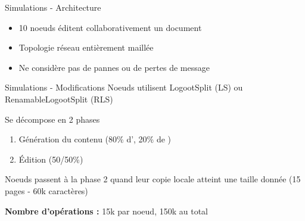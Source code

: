 \begin{frame}{Simulations - Architecture}
\begin{figure}
{
    }
  \end{figure}
  \begin{itemize}
    \item \alert{10 noeuds} éditent collaborativement un document
    \item Topologie \alert{réseau entièrement maillée}
    \item Ne considère \alert{pas de pannes ou de pertes de message}
  \end{itemize}
\end{frame}

\begin{frame}{Simulations - Modifications}
  Noeuds \alert{utilisent LogootSplit} (LS) ou \alert{RenamableLogootSplit} (RLS)
  \pause
  \begin{block}{Se décompose en 2 phases}
    \begin{enumerate}
      \item \alert{Génération du contenu} (80\% d'\ins, 20\% de \rmv)
      \item \alert{Édition} (50/50\%)
    \end{enumerate}
    Noeuds passent à la phase 2 quand leur copie locale atteint une taille donnée (15 pages - 60k caractères)
  \end{block}
  \pause
  \textbf{Nombre d'opérations : } 15k par noeud, 150k au total
\end{frame}

